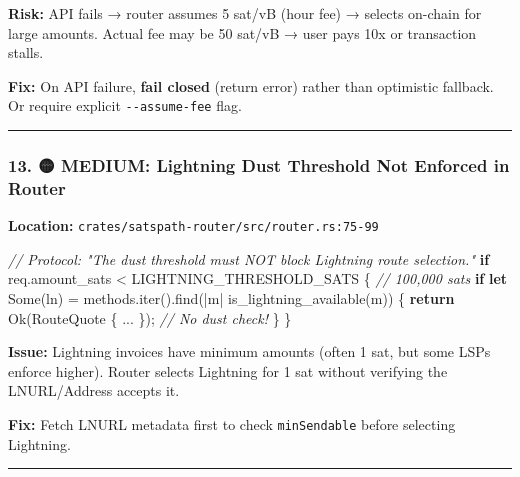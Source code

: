 \documentclass[
]{article}
\newenvironment{Shaded}{}{}
\newcommand{\CommentTok}[1]{\textcolor[rgb]{0.38,0.63,0.69}{\textit{#1}}}
\newcommand{\ConstantTok}[1]{\textcolor[rgb]{0.53,0.00,0.00}{#1}}
\newcommand{\ControlFlowTok}[1]{\textcolor[rgb]{0.00,0.44,0.13}{\textbf{#1}}}
\newcommand{\KeywordTok}[1]{\textcolor[rgb]{0.00,0.44,0.13}{\textbf{#1}}}
\newcommand{\NormalTok}[1]{#1}
\newcommand{\OperatorTok}[1]{\textcolor[rgb]{0.40,0.40,0.40}{#1}}
\begin{document}
\textbf{Risk:} API fails → router assumes 5 sat/vB (hour fee) → selects
on-chain for large amounts. Actual fee may be 50 sat/vB → user pays 10x
or transaction stalls.

\textbf{Fix:} On API failure, \textbf{fail closed} (return error) rather
than optimistic fallback. Or require explicit \texttt{-\/-assume-fee}
flag.

\begin{center}\rule{0.5\linewidth}{0.5pt}\end{center}

\hypertarget{medium-lightning-dust-threshold-not-enforced-in-router}{%
\subsubsection{13. 🟡 MEDIUM: Lightning Dust Threshold Not Enforced in
Router}\label{medium-lightning-dust-threshold-not-enforced-in-router}}

\textbf{Location:} \texttt{crates/satspath-router/src/router.rs:75-99}

\begin{Shaded}
\begin{Highlighting}[]
\CommentTok{// Protocol: "The dust threshold must NOT block Lightning route selection."}
\ControlFlowTok{if}\NormalTok{ req}\OperatorTok{.}\NormalTok{amount\_sats }\OperatorTok{\textless{}}\NormalTok{ LIGHTNING\_THRESHOLD\_SATS }\OperatorTok{\{}  \CommentTok{// 100,000 sats}
    \ControlFlowTok{if} \KeywordTok{let} \ConstantTok{Some}\NormalTok{(ln) }\OperatorTok{=}\NormalTok{ methods}\OperatorTok{.}\NormalTok{iter()}\OperatorTok{.}\NormalTok{find(}\OperatorTok{|}\NormalTok{m}\OperatorTok{|}\NormalTok{ is\_lightning\_available(m)) }\OperatorTok{\{}
        \ControlFlowTok{return} \ConstantTok{Ok}\NormalTok{(RouteQuote }\OperatorTok{\{} \OperatorTok{...} \OperatorTok{\}}\NormalTok{)}\OperatorTok{;}  \CommentTok{// No dust check!}
    \OperatorTok{\}}
\OperatorTok{\}}
\end{Highlighting}
\end{Shaded}

\textbf{Issue:} Lightning invoices have minimum amounts (often 1 sat,
but some LSPs enforce higher). Router selects Lightning for 1 sat
without verifying the LNURL/Address accepts it.

\textbf{Fix:} Fetch LNURL metadata first to check \texttt{minSendable}
before selecting Lightning.

\begin{center}\rule{0.5\linewidth}{0.5pt}\end{center}
\end{document}
